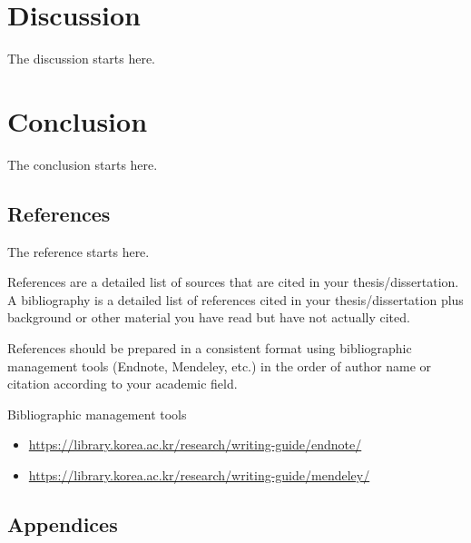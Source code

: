\documentclass[11pt]{report}
\numberwithin{figure}{section}
\theoremstyle{plain}
\theoremstyle{definition}
\theoremstyle{corollary}
\theoremstyle{definition}
\theoremstyle{plain}
\theoremstyle{definition}
\theoremstyle{plain}
\begin{document}
\leftskip 0cm
\rightskip 0cm 

\chapter{Discussion}\label{chap:discussion}
The discussion starts here.

\chapter{Conclusion}\label{chap:conclusion}
The conclusion starts here. \par



\begin{center}
\chapter*{References} %
\end{center}

\normalsize
The reference starts here. \par
References are a detailed list of sources that are cited in your thesis/dissertation. A bibliography is a detailed list of references cited in your thesis/dissertation plus background or other material you have read but have not actually cited.

References should be prepared in a consistent format using bibliographic management tools (Endnote, Mendeley, etc.) in the order of author name or citation according to your academic field.

\bigskip

Bibliographic management tools
\begin{itemize}
\item\url{https://library.korea.ac.kr/research/writing-guide/endnote/}
\item\url{https://library.korea.ac.kr/research/writing-guide/mendeley/}
\end{itemize}

\begin{center}
\chapter*{Appendices} %
\end{center}
\end{document}
